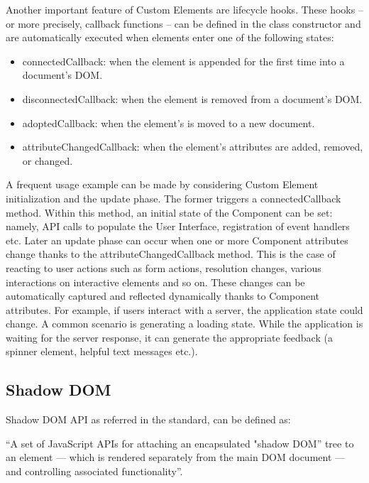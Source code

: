 Another important feature of Custom Elements are lifecycle hooks. These hooks – or more precisely, callback functions – can be defined in the class constructor and are automatically executed when elements enter one of the following states:

\begin{itemize}
\item connectedCallback: when the element is appended for the first time into a document’s DOM.
\item disconnectedCallback: when the element is removed from a document’s DOM.
\item adoptedCallback: when the element’s is moved to a new document.
\item attributeChangedCallback: when the element’s attributes are added, removed, or changed.
\end{itemize}

A frequent usage example can be made by considering Custom Element initialization and the update phase. The former triggers a connectedCallback method. Within this method, an initial state of the Component can be set: namely, API calls to populate the User Interface, registration of event handlers etc. Later an update phase can occur when one or more Component attributes change thanks to the attributeChangedCallback method. This is the case of reacting to user actions such as form actions, resolution changes, various interactions on interactive elements and so on. These changes can be automatically captured and reflected dynamically thanks to Component attributes. For example, if users interact with a server, the application state could change. A common scenario is generating a loading state. While the application is waiting for the server response, it can generate the appropriate feedback (a spinner element, helpful text messages etc.).

\subsection{Shadow DOM}
\label{subsec:shadowDOM}

Shadow DOM API as referred in the standard, can be defined as: 

\begin{displayquote}

“A set of JavaScript APIs for attaching an encapsulated "shadow DOM” tree to an element — which is rendered separately from the main DOM document — and controlling associated functionality”.

\end{displayquote}

